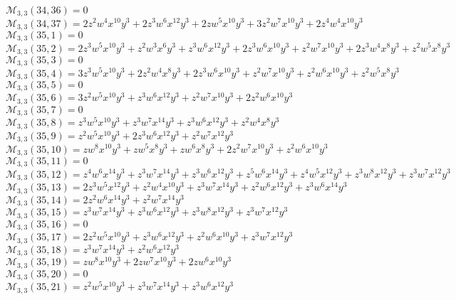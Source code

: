 $\mathcal{M}_{3,3}(34,36)=0$\\
$\mathcal{M}_{3,3}(34,37)=2z^2w^4x^{10}y^3+2z^3w^6x^{12}y^3+2zw^5x^{10}y^3+3z^2w^7x^{10}y^3+2z^4w^4x^{10}y^3$\\
$\mathcal{M}_{3,3}(35,1)=0$\\
$\mathcal{M}_{3,3}(35,2)=2z^3w^5x^{10}y^3+z^2w^3x^6y^3+z^3w^6x^{12}y^3+2z^3w^6x^{10}y^3+z^2w^7x^{10}y^3+2z^3w^4x^8y^3+z^2w^5x^8y^3$\\
$\mathcal{M}_{3,3}(35,3)=0$\\
$\mathcal{M}_{3,3}(35,4)=3z^3w^5x^{10}y^3+2z^2w^4x^8y^3+2z^3w^6x^{10}y^3+z^2w^7x^{10}y^3+z^2w^6x^{10}y^3+z^2w^5x^8y^3$\\
$\mathcal{M}_{3,3}(35,5)=0$\\
$\mathcal{M}_{3,3}(35,6)=3z^2w^5x^{10}y^3+z^3w^6x^{12}y^3+z^2w^7x^{10}y^3+2z^2w^6x^{10}y^3$\\
$\mathcal{M}_{3,3}(35,7)=0$\\
$\mathcal{M}_{3,3}(35,8)=z^3w^5x^{10}y^3+z^3w^7x^{14}y^3+z^3w^6x^{12}y^3+z^2w^4x^8y^3$\\
$\mathcal{M}_{3,3}(35,9)=z^2w^5x^{10}y^3+2z^3w^6x^{12}y^3+z^2w^7x^{12}y^3$\\
$\mathcal{M}_{3,3}(35,10)=zw^8x^{10}y^3+zw^5x^8y^3+zw^6x^8y^3+2z^2w^7x^{10}y^3+z^2w^6x^{10}y^3$\\
$\mathcal{M}_{3,3}(35,11)=0$\\
$\mathcal{M}_{3,3}(35,12)=z^4w^6x^{14}y^3+z^3w^7x^{14}y^3+z^3w^6x^{12}y^3+z^5w^6x^{14}y^3+z^4w^5x^{12}y^3+z^3w^8x^{12}y^3+z^3w^7x^{12}y^3$\\
$\mathcal{M}_{3,3}(35,13)=2z^3w^5x^{12}y^3+z^2w^4x^{10}y^3+z^3w^7x^{14}y^3+z^2w^6x^{12}y^3+z^3w^6x^{14}y^3$\\
$\mathcal{M}_{3,3}(35,14)=2z^2w^6x^{14}y^3+z^2w^7x^{14}y^3$\\
$\mathcal{M}_{3,3}(35,15)=z^3w^7x^{14}y^3+z^3w^6x^{12}y^3+z^3w^8x^{12}y^3+z^3w^7x^{12}y^3$\\
$\mathcal{M}_{3,3}(35,16)=0$\\
$\mathcal{M}_{3,3}(35,17)=2z^2w^5x^{10}y^3+z^3w^6x^{12}y^3+z^2w^6x^{10}y^3+z^3w^7x^{12}y^3$\\
$\mathcal{M}_{3,3}(35,18)=z^3w^7x^{14}y^3+z^2w^6x^{12}y^3$\\
$\mathcal{M}_{3,3}(35,19)=zw^8x^{10}y^3+2zw^7x^{10}y^3+2zw^6x^{10}y^3$\\
$\mathcal{M}_{3,3}(35,20)=0$\\
$\mathcal{M}_{3,3}(35,21)=z^2w^5x^{10}y^3+z^3w^7x^{14}y^3+z^3w^6x^{12}y^3$\\
